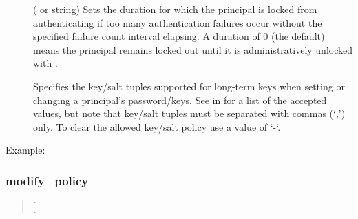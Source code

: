 \documentclass[letterpaper,10pt,english]{sphinxmanual}
\begin{document}
\label{\detokenize{admin/admin_commands/kadmin_local:policy-lockoutduration}}\begin{description}
\item[{ }] \leavevmode
( or  string) Sets the duration for
which the principal is locked from authenticating if too many
authentication failures occur without the specified failure count
interval elapsing.  A duration of 0 (the default) means the
principal remains locked out until it is administratively unlocked
with .

\item[{}] \leavevmode
Specifies the key/salt tuples supported for long-term keys when
setting or changing a principal’s password/keys.  See
{\hyperref[\detokenize{admin/conf_files/kdc_conf:keysalt-lists}]{}} in {\hyperref[\detokenize{admin/conf_files/kdc_conf:kdc-conf-5}]{}} for a list of the
accepted values, but note that key/salt tuples must be separated
with commas (‘,’) only.  To clear the allowed key/salt policy use
a value of ‘-‘.

\end{description}

Example:

%
\begin{sphinxVerbatim}[commandchars=\\\{\}]
      
\end{sphinxVerbatim}


\subsubsection{modify\_policy}
\label{\detokenize{admin/admin_commands/kadmin_local:id13}}\label{\detokenize{admin/admin_commands/kadmin_local:modify-policy}}\begin{quote}

 {[}\sphinxstyleemphasis{options}{]} 
\end{quote}
\end{document}
